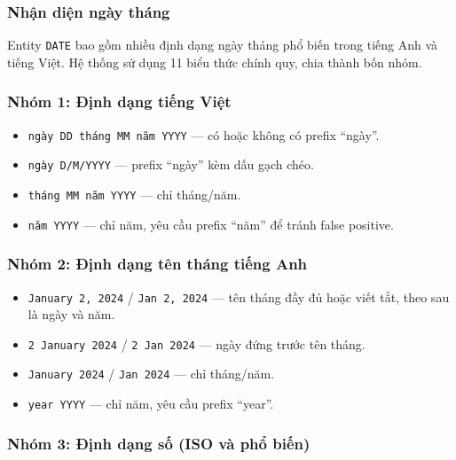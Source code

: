 \subsubsection{Nhận diện ngày tháng}
\label{sec:date_detection}

Entity \texttt{DATE} bao gồm nhiều định dạng ngày tháng phổ biến trong tiếng
Anh và tiếng Việt. Hệ thống sử dụng 11 biểu thức chính quy, chia thành bốn
nhóm.

\subsubsection*{Nhóm 1: Định dạng tiếng Việt}

\begin{itemize}[nosep]
    \item \texttt{ngày DD tháng MM năm YYYY} --- có hoặc không có prefix
          ``ngày''.
    \item \texttt{ngày D/M/YYYY} --- prefix ``ngày'' kèm dấu gạch chéo.
    \item \texttt{tháng MM năm YYYY} --- chỉ tháng/năm.
    \item \texttt{năm YYYY} --- chỉ năm, yêu cầu prefix ``năm'' để tránh
          false positive.
\end{itemize}

\subsubsection*{Nhóm 2: Định dạng tên tháng tiếng Anh}

\begin{itemize}[nosep]
    \item \texttt{January 2, 2024} / \texttt{Jan 2, 2024} --- tên tháng đầy
          đủ hoặc viết tắt, theo sau là ngày và năm.
    \item \texttt{2 January 2024} / \texttt{2 Jan 2024} --- ngày đứng trước
          tên tháng.
    \item \texttt{January 2024} / \texttt{Jan 2024} --- chỉ tháng/năm.
    \item \texttt{year YYYY} --- chỉ năm, yêu cầu prefix ``year''.
\end{itemize}

\subsubsection*{Nhóm 3: Định dạng số (ISO và phổ biến)}

